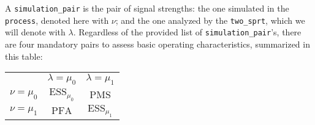 \documentclass[12pt]{article}
\newcommand{\ESS}{\mathrm{ESS}}
\newcommand{\PFA}{\mathrm{PFA}}
\newcommand{\PMS}{\mathrm{PMS}}
\begin{document}
A \texttt{simulation\_pair} is the pair of signal strengths: the one simulated in the \texttt{process}, denoted here with $\nu $; and the one analyzed by the \texttt{two\_sprt}, which we will denote with $\lambda $.
Regardless of the provided list of \texttt{simulation\_pair}'s, there are four mandatory pairs to assess basic operating characteristics, summarized in this table:
\begin{center}
    \renewcommand{\arraystretch}{1.4}
    \begin{tabular}{ r | c | c | }
        \multicolumn{1}{r}{}
            & \multicolumn{1}{c}{$\lambda = \mu _0$}
            & \multicolumn{1}{c}{$\lambda = \mu _1$}           \\ \cline{2-3}
        $\nu = \mu _0$  & $\ESS _{\mu _0}$  & $\PMS $          \\ \cline{2-3}
        $\nu = \mu _1$  & $\PFA $           & $\ESS _{\mu _1}$ \\ \cline{2-3}
    \end{tabular}
\end{center}
\end{document}
